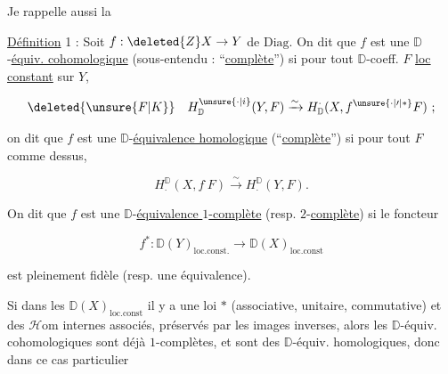 

Je rappelle aussi la

\uline{Définition} 1 : Soit $f:\deleted{Z}X\to Y$ de $\mathrm{Diag}$. On dit que $f$ est une $\mathbb D$-\uline{équiv. cohomologique} (sous-entendu : ``\uline{complète}'') si pour tout $\mathbb D$-coeff. $F$ \uline{loc constant} sur $Y$,

\[
\deleted{\unsure{F|K}}\quad H^{\unsure{\cdot|i}}_{\mathbb D}(Y,F)\xrightarrow{\sim}H^{\cdot}_{\mathbb D}(X,f^{\unsure{\cdot|{\prime}|*}}F)\ ;
\]

on dit que $f$ est une $\mathbb D$-\uline{équivalence homologique} (``\uline{complète}'') si pour tout $F$ comme dessus,

\[
H_{\cdot}^{\mathbb D}(X,f^{\cdot}F)\xrightarrow{\sim}H_{\cdot}^{\mathbb D}(Y,F).
\]

On dit que $f$ est une $\mathbb D$-\uline{équivalence $1$-complète} (resp. $2$-\uline{complète}) si  le foncteur

\[
f^*:\mathbb D(Y)_{\mathrm{loc.const.}}\longrightarrow\mathbb D(X)_{\mathrm{loc.const}}
\]

est pleinement fidèle (resp. une équivalence).


Si dans les  $\mathbb D(X)_{\mathrm{loc.const}}$ il y a une loi $*$ (associative, unitaire, commutative) et des $\mathcal H\mathrm{om}$ internes associés, préservés par les images inverses, alors les $\mathbb D$-équiv.  cohomologiques sont déjà $1$-complètes, et sont  des $\mathbb D$-équiv. homologiques, donc dans ce cas particulier

